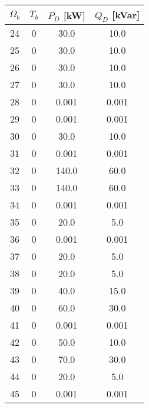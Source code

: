 \begin{table}[H]
\begin{minipage}{.5\linewidth}
\begin{tabular}{|c|c|c|c|}
        \end{tabular}
        
    \end{minipage}%
    \begin{minipage}{.5\linewidth}
        \centering
         \begin{tabular}{|c|c|c|c|} 
            \hline
            $\Omega_b$ & $T_b$ & $P_D$ [kW] & $Q_D$ [kVar]\\ \hline
            24 &  0 &   30.0 &   10.0\\ \hline
            25 &  0 &   30.0 &   10.0\\ \hline
            26 &  0 &   30.0 &   10.0\\ \hline
            27 &  0 &   30.0 &   10.0\\ \hline
            28 &  0 &  0.001 &  0.001\\ \hline
            29 &  0 &  0.001 &  0.001\\ \hline
            30 &  0 &   30.0 &   10.0\\ \hline
            31 &  0 &  0.001 &  0.001\\ \hline
            32 &  0 &  140.0 &   60.0\\ \hline
            33 &  0 &  140.0 &   60.0\\ \hline
            34 &  0 &  0.001 &  0.001\\ \hline
            35 &  0 &   20.0 &    5.0\\ \hline
            36 &  0 &  0.001 &  0.001\\ \hline
            37 &  0 &   20.0 &    5.0\\ \hline
            38 &  0 &   20.0 &    5.0\\ \hline
            39 &  0 &   40.0 &   15.0\\ \hline
            40 &  0 &   60.0 &   30.0\\ \hline
            41 &  0 &  0.001 &  0.001\\ \hline
            42 &  0 &   50.0 &   10.0\\ \hline
            43 &  0 &   70.0 &   30.0\\ \hline
            44 &  0 &   20.0 &    5.0\\ \hline
            45 &  0 &  0.001 &  0.001\\ \hline

            
            \end{tabular}
    \end{minipage} 
\end{table}